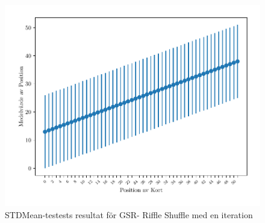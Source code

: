 \documentclass[swedish,a4paper]{article}
\begin{document}
\begin{figure}[H]
    \begin{center}
        \includegraphics{gsr_riffle_shuffle-1}
    \end{center}
    \caption{STDMean-testests resultat för GSR- Riffle Shuffle med en iteration}
    \label{fig:test_figure}
\end{figure}
\end{document}
